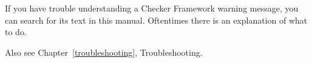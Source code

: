 If you have trouble understanding a Checker Framework warning message, you
can search for its text in this manual.
Oftentimes there is an explanation of what to do.

Also see Chapter~\ref{troubleshooting}, Troubleshooting.


